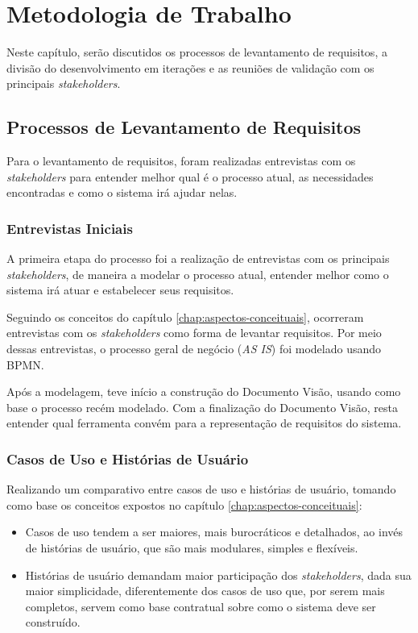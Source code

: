 \chapter{Metodologia de Trabalho}\label{chap:metodologia-trabalho}
Neste capítulo, serão discutidos os processos de levantamento de requisitos, a divisão do desenvolvimento em iterações e as reuniões de validação com os principais \textit{stakeholders}.

\section{Processos de Levantamento de Requisitos}
Para o levantamento de requisitos, foram realizadas entrevistas com os \textit{stakeholders} para entender melhor qual é o processo atual, as necessidades encontradas e como o sistema irá ajudar nelas.

\subsection{Entrevistas Iniciais}
A primeira etapa do processo foi a realização de entrevistas com os principais \textit{stakeholders}, de maneira a modelar o processo atual, entender melhor como o sistema irá atuar e estabelecer seus requisitos.

Seguindo os conceitos do capítulo \ref{chap:aspectos-conceituais}, ocorreram entrevistas com os \textit{stakeholders} como forma de levantar requisitos. Por meio dessas entrevistas, o processo geral de negócio (\textit{AS IS}) foi modelado usando BPMN.

Após a modelagem, teve início a construção do Documento Visão, usando como base o processo recém modelado. Com a finalização do Documento Visão, resta entender qual ferramenta convém para a representação de requisitos do sistema.

\subsection{Casos de Uso e Histórias de Usuário}
Realizando um comparativo entre casos de uso e histórias de usuário, tomando como base os conceitos expostos no capítulo \ref{chap:aspectos-conceituais}:

\begin{itemize}
    \item Casos de uso tendem a ser maiores, mais burocráticos e detalhados, ao invés de histórias de usuário, que são mais modulares, simples e flexíveis.
    \item Histórias de usuário demandam maior participação dos \textit{stakeholders}, dada sua maior simplicidade, diferentemente dos casos de uso que, por serem mais completos, servem como base contratual sobre como o sistema deve ser construído.
\end{itemize}

